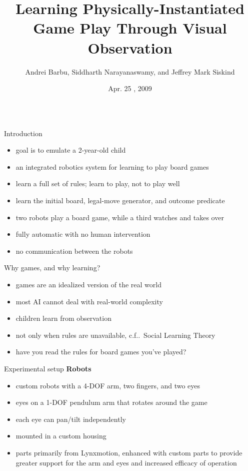 \documentclass[final,t]{beamer}
\title{\Huge Learning Physically-Instantiated Game Play Through Visual
Observation}
\author{Andrei Barbu, Siddharth Narayanaswamy, and Jeffrey Mark Siskind}
\institute[School of ECE]{School of Electrical and Computer Engineering}
\date[Apr. 25 , 2009]{Apr. 25 , 2009}
\makeatletter
\DeclareRobustCommand\onedot{\futurelet\@let@token\@onedot}
\def\@onedot{\ifx\@let@token.\else.\null\fi\xspace}
\def\cf{{c.f}\onedot} \def\Cf{{C.f}\onedot}
\makeatother
\begin{document}
\begin{frame}{}
  \begin{columns}[t]
    \begin{column}{.3\linewidth}
      \begin{block}{Introduction}
	\begin{itemize}
	\item goal is to emulate a 2-year-old child
	\item an integrated robotics system for learning to play board games
	\item learn a full set of \alert{rules}; learn to play, not to
	  play well
	\item learn the initial board, legal-move generator, and
	  outcome predicate
	\item two robots play a board game, while a third watches and takes
	  over
	\item fully automatic with no human intervention
	\item no communication between the robots
	\end{itemize}
      \end{block}

      \begin{block}{Why games, and why learning?}
	\begin{itemize}
	\item games are an idealized version of the real world
	\item most AI cannot deal with real-world complexity
	\item children learn from observation
	\item not only when rules are unavailable, \cf\ Social Learning
	  Theory
	\item have you read the rules for board games you've played?
	\end{itemize}
      \end{block}

      \begin{block}{Experimental setup}
	\textbf{Robots}
	\begin{itemize}
	\item custom robots with a 4-DOF arm, two fingers, and two eyes
	\item eyes on a 1-DOF pendulum arm that rotates around the game
	\item each eye can pan/tilt independently
	\item mounted in a custom housing
	\item parts primarily from Lynxmotion, enhanced with custom parts
	  to provide greater support for the arm and eyes and increased
	  efficacy of operation
	\end{itemize}


\end{block}
\end{column}
\end{columns}
\end{frame}
\end{document}
